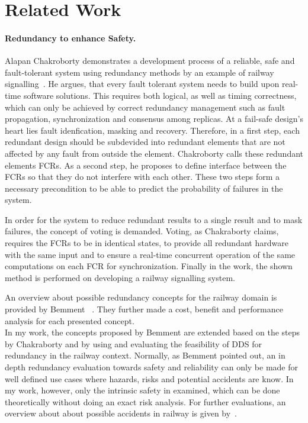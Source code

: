 \section{Related Work}
\paragraph{Redundancy to enhance Safety.}
Alapan Chakroborty demonstrates a development process of a reliable, safe and fault-tolerant system using redundancy methods by an example of railway signalling~\cite{ChakrabortyFaultTolerantRailway}.
He argues, that every fault tolerant system needs to build upon real-time software solutions.
This requires both logical, as well as timing correctness, which can only be achieved by correct redundancy management such as fault propagation, synchronization and consensus among replicas.
At a fail-safe design's heart lies fault idenfication, masking and recovery.
Therefore, in a first step, each redundant design should be subdevided into redundant elements that are not affected by any fault from outside the element.
Chakroborty calls these redundant elements \glspl*{FCR}.
As a second step, he proposes to define interface between the \glspl*{FCR} so that they do not interfere with each other.
These two steps form a necessary precondition to be able to predict the probability of failures in the system.

In order for the system to reduce redundant results to a single result and to mask failures, the concept of voting is demanded.
Voting, as Chakraborty claims, requires the \glspl*{FCR} to be in identical states, to provide all redundant hardware with the same input and to ensure a real-time concurrent operation of the same computations on each \gls*{FCR} for synchronization.
Finally in the work, the shown method is performed on developing a railway signalling system.

An overview about possible redundancy concepts for the railway domain is provided by Bemment \etal~\cite{BemmentEvaluationOfRedundancy}.
They further made a cost, benefit and performance analysis for each presented concept.
\\

In my work, the concepts proposed by Bemment \etal are extended based on the steps by Chakraborty and by using and evaluating the feasibility of \gls*{DDS} for redundancy in the railway context.
Normally, as Bemment \etal pointed out, an in depth redundancy evaluation towards safety and reliability can only be made for well defined use cases where hazards, risks and potential accidents are know.
In my work, however, only the intrinsic safety in examined, which can be done theoretically without doing an exact risk analysis.
For further evaluations, an overview about about possible accidents in railway is given by~\cite{ERTMSRailwayAccidents}.
\\

